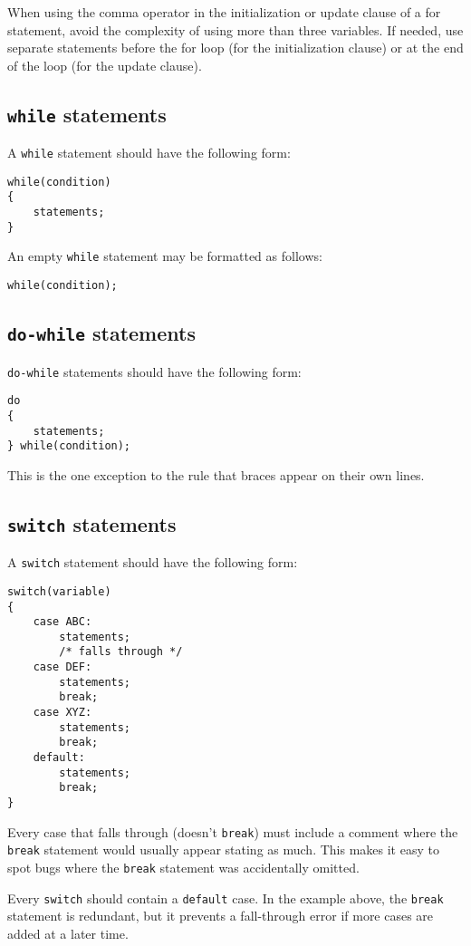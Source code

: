 \documentclass{article}
\newcommand{\code}[1]{\texttt{\colorbox{gray!30}{#1}}}
\begin{document}
When using the comma operator in the initialization or update clause of a for statement, avoid the complexity of using more than three variables.
If needed, use separate statements before the for loop (for the initialization clause) or at the end of the loop (for the update clause).

\subsection{\code{while} statements}
A \code{while} statement should have the following form:
\begin{lstlisting}
while(condition)
{
	statements;
}
\end{lstlisting}

An empty \code{while} statement may be formatted as follows:
\begin{lstlisting}
while(condition);
\end{lstlisting}

\subsection{\code{do-while} statements}
\code{do-while} statements should have the following form:
\begin{lstlisting}
do
{
	statements;
} while(condition);
\end{lstlisting}

This is the one exception to the rule that braces appear on their own lines.

\subsection{\code{switch} statements}
A \code{switch} statement should have the following form:
\begin{lstlisting}
switch(variable)
{
	case ABC:
		statements;
		/* falls through */
	case DEF:
		statements;
		break;
	case XYZ:
		statements;
		break;
	default:
		statements;
		break;
}
\end{lstlisting}

Every case that falls through (doesn't \code{break}) must include a comment where the \code{break} statement would usually appear stating as much.
This makes it easy to spot bugs where the \code{break} statement was accidentally omitted.

Every \code{switch} should contain a \code{default} case.
In the example above, the \code{break} statement is redundant, but it prevents a fall-through error if more cases are added at a later time.
\end{document}
